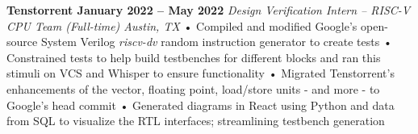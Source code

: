 \documentclass[../main.tex]{subfiles}
\begin{document}
%
\noindent\textbf{{\fontsize{\textFontSize}{\textFontBox}\selectfont Tenstorrent \hfill January 2022 – May 2022}}
\vspace{1mm}\newline
%
%
{\fontsize{\textFontSize}{\textFontBox}\selectfont\emph{Design Verification Intern – RISC-V CPU Team (Full-time) \hfill Austin, TX \hspace{0 cm}}}\vspace{0mm}\newline
%
%
{\fontsize{\textFontSize}{\textFontBox}\selectfont • \hspace{1mm} Compiled and modified Google’s open-source System Verilog \emph{riscv-dv} random instruction generator to create tests }\newline
{\fontsize{\textFontSize}{\textFontBox}\selectfont • \hspace{1mm} Constrained tests to help build testbenches for different blocks and ran this stimuli on VCS and Whisper to ensure functionality }\newline
{\fontsize{\textFontSize}{\textFontBox}\selectfont • \hspace{1mm} Migrated Tenstorrent’s enhancements of the vector, floating point, load/store units - and more - to Google’s head commit }\newline
{\fontsize{\textFontSize}{\textFontBox}\selectfont • \hspace{1mm} Generated diagrams in React using Python and data from SQL to visualize the RTL interfaces; streamlining testbench generation }\newline
%
%
\end{document}
